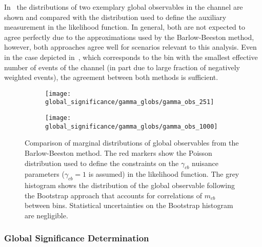 In~ the distributions of two
exemplary global observables in the \hadhad channel are shown and
compared with the distribution used to define the auxiliary
measurement in the likelihood function. In general, both are not
expected to agree perfectly due to the approximations used by the
Barlow-Beeston method, however, both approaches agree well for
scenarios relevant to this analysis. Even in the case depicted
in~, which
corresponds to the bin with the smallest effective number of events of
the \hadhad channel (in part due to large fraction of negatively
weighted events), the agreement between both methods is sufficient.

\begin{figure}[htbp]
  \centering

  \begin{subfigure}{0.485\textwidth}
    \centering

    \texttt{[image: global\_significance/gamma\_globs/gamma\_obs\_251]}
    \label{fig:comparison_bootstrap_poisson_lowest_tau}
  \end{subfigure}\hfill%
  \begin{subfigure}{0.485\textwidth}
    \centering

    \texttt{[image: global\_significance/gamma\_globs/gamma\_obs\_1000]}
  \end{subfigure}

  \caption{Comparison of marginal distributions of global observables
    from the Barlow-Beeston method. The red markers show the Poisson
    distribution used to define the constraints on the $\gamma_{cb}$
    nuisance parameters ($\gamma_{cb} = 1$ is assumed) in the
    likelihood function. The grey histogram shows the distribution of
    the global observable following the Bootstrap approach that
    accounts for correlations of $m_{cb}$ between bins. Statistical
    uncertainties on the Bootstrap histogram are negligible.}
  \label{fig:comparison_bootstrap_poisson}
\end{figure}


\subsubsection{Global Significance Determination}


